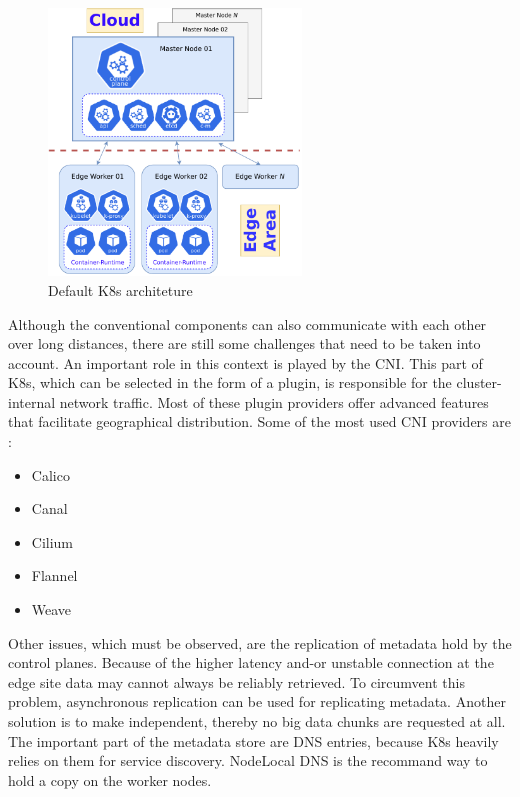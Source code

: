 \documentclass[MSC,Master,english]{twbook}%
\begin{document}
\begin{figure}[ht]
    \centering
    \includegraphics[width=0.60\textwidth]{PICs/drawio/defaul-k8s.drawio.pdf}
    \caption{Default \ac{K8s} architeture}
    \label{fig:k8s-default}
\end{figure}

Although the conventional components can also communicate with each other over long distances, there are still some challenges that need to be taken into account. An important role in this context is played by the \ac{CNI}. This part of \ac{K8s}, which can be selected in the form of a plugin, is responsible for the cluster-internal network traffic. Most of these plugin providers offer advanced features that facilitate geographical distribution. Some of the most used \ac{CNI} providers are \cite{k8s-cni}:

\begin{itemize}
    \itemsep0em
    \item Calico
    \item Canal
    \item Cilium
    \item Flannel
    \item Weave
\end{itemize}

Other issues, which must be observed, are the replication of metadata hold by the control planes. Because of the higher latency and-or unstable connection at the edge site data may cannot always be reliably retrieved. To circumvent this problem, asynchronous replication can be used for replicating metadata. Another solution is to make independent, thereby no big data chunks are requested at all. The important part of the metadata store are \ac{DNS} entries, because \ac{K8s} heavily relies on them for service discovery. NodeLocal DNS is the recommand way \cite{k8sdnslocal} to hold a copy on the worker nodes. 
\end{document}
